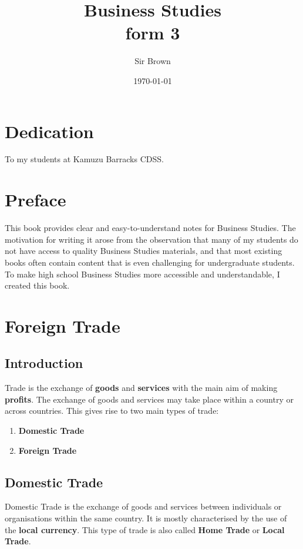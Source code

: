 \documentclass[12pt,a4paper, openany]{book}
\begin{document}
\frontmatter
\title{Business Studies \\ form 3}
\author{Sir Brown}
\date{\today}

\maketitle

\chapter*{Dedication}
To my students at Kamuzu Barracks CDSS.

\chapter*{Preface}
This book provides clear and easy-to-understand notes for Business Studies.
The motivation for writing it arose from the observation that many of my students
do not have access to quality Business Studies materials, and that most existing
books often contain content that is even challenging for undergraduate students.
To make high school Business Studies more accessible and understandable,
I created this book.

\tableofcontents

\mainmatter
\chapter{Foreign Trade}

\section{Introduction}
Trade is the exchange of \textbf{goods} and \textbf{services} with the main aim of making \textbf{profits}.
The exchange of goods and services may take place within a country or across countries.
This gives rise to two main types of trade:
\begin{enumerate}
	\item \textbf{Domestic Trade}
	\item \textbf{Foreign Trade}
\end{enumerate}

\section{Domestic Trade}
Domestic Trade is the exchange of goods and services between individuals or organisations within the same country.
It is mostly characterised by the use of the \textbf{local currency}.
This type of trade is also called \textbf{Home Trade} or \textbf{Local Trade}.
\end{document}
